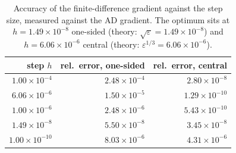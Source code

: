 \begin{table}[htbp]
  \centering
  \small
  \caption{Accuracy of the finite-difference gradient against the step size, measured against the AD gradient. The optimum sits at $h=1.49\times 10^{-8}$ one-sided (theory: $\sqrt{\varepsilon}=1.49\times 10^{-8}$) and $h=6.06\times 10^{-6}$ central (theory: $\varepsilon^{1/3}=6.06\times 10^{-6}$).}
  \label{res:tab:fd}
  \begin{tabular}{rrr}
    \toprule
    step $h$ & rel.\ error, one-sided & rel.\ error, central \\
    \midrule
    $1.00\times 10^{-4}$ & $2.48\times 10^{-4}$ & $2.80\times 10^{-8}$ \\
    $6.06\times 10^{-6}$ & $1.50\times 10^{-5}$ & $1.29\times 10^{-10}$ \\
    $1.00\times 10^{-6}$ & $2.48\times 10^{-6}$ & $5.43\times 10^{-10}$ \\
    $1.49\times 10^{-8}$ & $5.50\times 10^{-8}$ & $3.45\times 10^{-8}$ \\
    $1.00\times 10^{-10}$ & $8.03\times 10^{-6}$ & $4.31\times 10^{-6}$ \\
    \bottomrule
  \end{tabular}
\end{table}

